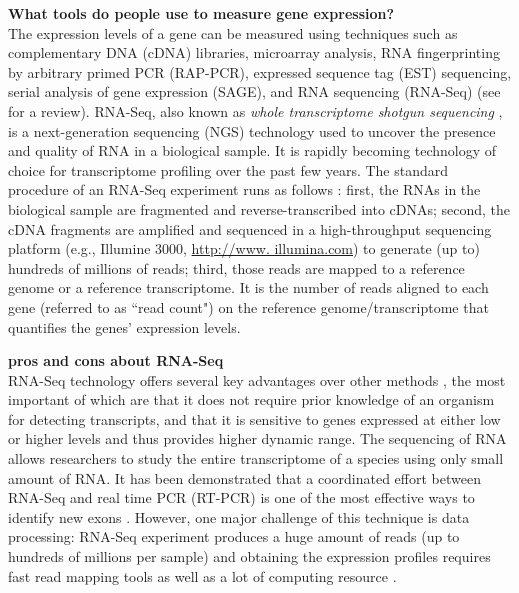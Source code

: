 \textbf{What tools do people use to measure gene expression?}\\
The  expression levels of a gene can be measured using techniques such as
complementary DNA (cDNA) libraries, microarray analysis, RNA fingerprinting by arbitrary primed PCR
(RAP-PCR), expressed sequence tag (EST) sequencing, serial analysis of gene expression (SAGE), and
RNA sequencing (RNA-Seq) (see \cite{casassola2013gene} for a review).
RNA-Seq, also known as \textit{whole transcriptome shotgun sequencing}
\citep{morin2008profiling}, is a next-generation sequencing (NGS) technology used to uncover the
presence and quality of RNA in a biological sample.  It is rapidly becoming technology of choice
for transcriptome profiling over the past few years. 
The standard procedure of an RNA-Seq experiment runs as follows 
\citep{finotello2015measuring}: first, the RNAs in the biological sample are fragmented and
reverse-transcribed into cDNAs; second, the cDNA fragments are amplified and sequenced in a
high-throughput sequencing platform (e.g., Illumine 3000, \url{http://www. illumina.com}) to
generate (up to) hundreds of millions of reads; third, those reads are mapped to a reference
genome
or a reference transcriptome.
It is the number of reads aligned to each gene (referred to as ``read count") on the reference
genome/transcriptome that quantifies the genes' expression levels.  


\textbf{pros and cons about RNA-Seq}\\
RNA-Seq technology offers several key advantages over other methods \citep{wang2009rna}, the most
important of which are that it does not require prior knowledge of an organism for detecting
transcripts,  and that it is sensitive to genes expressed at either low or higher levels and thus
provides higher dynamic range. The sequencing of RNA allows researchers to study the entire
transcriptome of a species using only small amount of RNA. It has been demonstrated that a
coordinated effort between RNA-Seq and real time PCR (RT-PCR) is one of the most effective ways to
identify new exons \citep{howald2012combining}. However, one major challenge of this technique is
data processing: RNA-Seq experiment produces a huge amount of reads (up to hundreds of
millions per sample) and obtaining the expression profiles requires fast read mapping tools as well
as a lot of computing resource
\citep{langmead2009ultrafast,li2010fast}.



